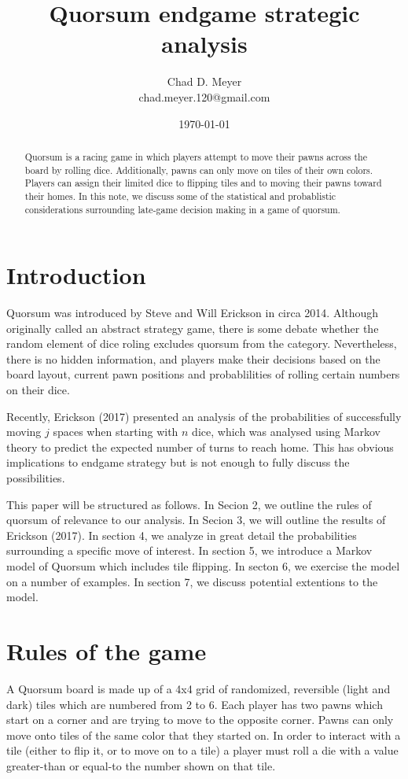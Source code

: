 \documentclass[letterpaper,11pt]{article}
\begin{document}
\title{Quorsum endgame strategic analysis}
\author{Chad D. Meyer \\ chad.meyer.120@gmail.com}
\date{\today}
\maketitle

\begin{abstract}
Quorsum is a racing game in which players attempt to move their pawns across
the board by rolling dice.  Additionally, pawns can only move on tiles of
their own colors.  Players can assign their limited dice to flipping tiles
and to moving their pawns toward their homes.  In this note, we discuss some
of the statistical and probablistic considerations surrounding late-game
decision making in a game of quorsum.
\end{abstract}

\section{Introduction}
Quorsum was introduced by Steve and Will Erickson in circa 2014.  Although
originally called an abstract strategy game, there is some debate whether the
random element of dice roling excludes quorsum from the category.  Nevertheless,
there is no hidden information, and players make their decisions based on the
board layout, current pawn positions and probablilities of rolling certain
numbers on their dice.

Recently, Erickson (2017) presented an analysis of the probabilities of
successfully moving $j$ spaces when starting with $n$ dice, which was analysed
using Markov theory to predict the expected number of turns to reach home.  This
has obvious implications to endgame strategy but is not enough to fully discuss
the possibilities.

This paper will be structured as follows.  In Secion 2, we outline the rules of
quorsum of relevance to our analysis.  In Secion 3, we will outline the results
of Erickson (2017).  In section 4, we analyze in great detail the probabilities
surrounding a specific move of interest.  In section 5, we introduce a Markov
model of Quorsum which includes tile flipping.  In secton 6, we exercise the
model on a number of examples.  In section 7, we discuss potential extentions
to the model.

\section{Rules of the game}
A Quorsum board is made up of a 4x4 grid of randomized, reversible (light and
dark) tiles which are numbered from 2 to 6.  Each player has two pawns which
start on a corner and are trying to move to the opposite corner.  Pawns can only
move onto tiles of the same color that they started on.  In order to
interact with a tile (either to flip it, or to move on to a tile) a player must
roll a die with a value greater-than or equal-to the number shown on that tile.
\end{document}
